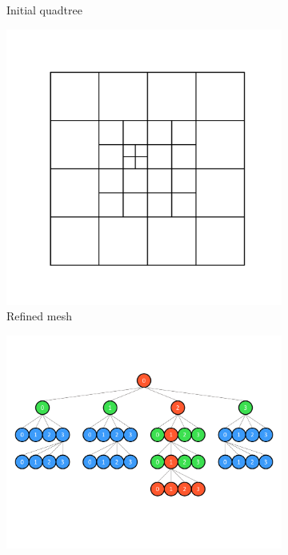 \begin{figure}[t]
\begin{subfigure}[t]{0.55\textwidth}
        \caption{Initial quadtree}
        \label{fig:adaptive-tree-rebuild-00}
    \end{subfigure}
    \begin{subfigure}[t]{0.35\textwidth}
        \includegraphics[width=0.95\linewidth, clip=true, trim={0 150 0 150}]{figures/adaptive-mesh-01.pdf}
        \caption{Refined mesh}
        \label{fig:adaptive-mesh-rebuild-01}
    \end{subfigure}
    \begin{subfigure}[t]{0.55\textwidth}
        \includegraphics[width=0.95\linewidth, clip=true, trim={0 140 0 100}]{figures/adaptive-tree-rebuild-01.pdf}

\end{subfigure}
\end{figure}
